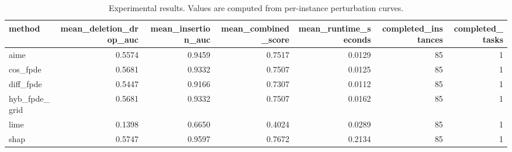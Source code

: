 \begin{table}[t]
\caption{Experimental results. Values are computed from per-instance perturbation curves.}
\label{tab:main_results_computed}
\centering
\begin{tabular}{lrrrrrr}
\toprule
method & mean\_deletion\_drop\_auc & mean\_insertion\_auc & mean\_combined\_score & mean\_runtime\_seconds & completed\_instances & completed\_tasks \\
\midrule
aime & 0.5574 & 0.9459 & 0.7517 & 0.0129 & 85 & 1 \\
cos\_fpde & 0.5681 & 0.9332 & 0.7507 & 0.0125 & 85 & 1 \\
diff\_fpde & 0.5447 & 0.9166 & 0.7307 & 0.0112 & 85 & 1 \\
hyb\_fpde\_grid & 0.5681 & 0.9332 & 0.7507 & 0.0162 & 85 & 1 \\
lime & 0.1398 & 0.6650 & 0.4024 & 0.0289 & 85 & 1 \\
shap & 0.5747 & 0.9597 & 0.7672 & 0.2134 & 85 & 1 \\
\bottomrule
\end{tabular}

\end{table}
